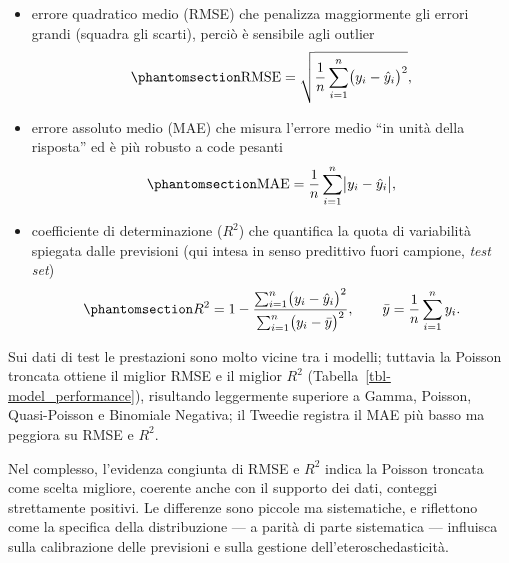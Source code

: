 \documentclass[
  italian,
  a4paper,
  a4paper,
  twoside,
  open=right,
  12pt]{scrbook}
\theoremstyle{definition}
\theoremstyle{remark}
\begin{document}
\begin{itemize}
\item
  errore quadratico medio (RMSE) che penalizza maggiormente gli errori
  grandi (squadra gli scarti), perciò è sensibile agli outlier
  \begin{equation}\phantomsection\label{eq-rmse}{
  \mathrm{RMSE}
  =
  \sqrt{\frac{1}{n}\sum_{i=1}^{n} \bigl(y_i - \hat{y}_i\bigr)^2},
  }\end{equation}
\item
  errore assoluto medio (MAE) che misura l'errore medio ``in unità della
  risposta'' ed è più robusto a code pesanti
  \begin{equation}\phantomsection\label{eq-mae}{
  \mathrm{MAE}
  =
  \frac{1}{n}\sum_{i=1}^{n} \bigl|y_i - \hat{y}_i\bigr|,
  }\end{equation}
\item
  coefficiente di determinazione (\(R^2\)) che quantifica la quota di
  variabilità spiegata dalle previsioni (qui intesa in senso predittivo
  fuori campione, \emph{test set})
  \begin{equation}\phantomsection\label{eq-r2}{
  R^2
  =
  1-\frac{\sum_{i=1}^{n} \bigl(y_i - \hat{y}_i\bigr)^2}{\sum_{i=1}^{n} \bigl(y_i - \bar{y}\bigr)^2},
  \qquad
  \bar{y}=\frac{1}{n}\sum_{i=1}^{n} y_i.
  }\end{equation}
\end{itemize}

Sui dati di test le prestazioni sono molto vicine tra i modelli;
tuttavia la Poisson troncata ottiene il miglior RMSE e il miglior
\(R^2\) (Tabella~\ref{tbl-model_performance}), risultando leggermente
superiore a Gamma, Poisson, Quasi-Poisson e Binomiale Negativa; il
Tweedie registra il MAE più basso ma peggiora su RMSE e \(R^2\).

Nel complesso, l'evidenza congiunta di RMSE e \(R^2\) indica la Poisson
troncata come scelta migliore, coerente anche con il supporto dei dati,
conteggi strettamente positivi. Le differenze sono piccole ma
sistematiche, e riflettono come la specifica della distribuzione --- a
parità di parte sistematica --- influisca sulla calibrazione delle
previsioni e sulla gestione dell'eteroschedasticità.
\end{document}
